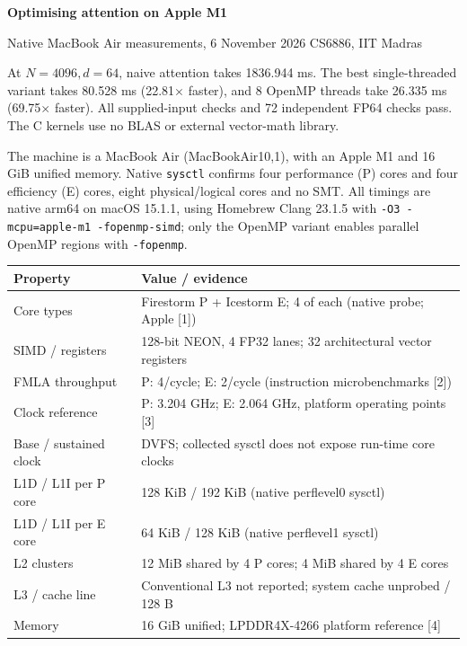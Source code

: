 \documentclass[10pt,a4paper]{article}
\newcommand{\question}[1]{\vspace{1mm}{\large\bfseries #1}\par\vspace{1mm}}
\begin{document}
{\LARGE\bfseries Optimising attention on Apple M1}\par
{\small Native MacBook Air measurements, 6 November 2026 \hfill CS6886, IIT Madras}

At $N=4096,d=64$, naive attention takes 1836.944 ms. The best single-threaded
variant takes 80.528 ms (22.81$\times$ faster), and 8 OpenMP threads take
26.335 ms (69.75$\times$ faster). All supplied-input checks and 72 independent
FP64 checks pass. The C kernels use no BLAS or external vector-math library.

\question{Q1. Machine and peak calculations}
The machine is a MacBook Air (MacBookAir10,1), with an Apple M1 and 16 GiB unified memory.
Native \texttt{sysctl} confirms four performance (P) cores and four efficiency (E) cores,
eight physical/logical cores and no SMT. All timings are native arm64 on macOS 15.1.1,
using Homebrew Clang 23.1.5 with \texttt{-O3 -mcpu=apple-m1 -fopenmp-simd};
only the OpenMP variant enables parallel OpenMP regions with \texttt{-fopenmp}.
\begin{center}
\footnotesize
\begin{tabular}{lp{111mm}}
\toprule
Property & Value / evidence \\
\midrule
Core types & Firestorm P + Icestorm E; 4 of each (native probe; Apple [1]) \\
SIMD / registers & 128-bit NEON, 4 FP32 lanes; 32 architectural vector registers \\
FMLA throughput & P: 4/cycle; E: 2/cycle (instruction microbenchmarks [2]) \\
Clock reference & P: 3.204 GHz; E: 2.064 GHz, platform operating points [3] \\
Base / sustained clock & DVFS; collected sysctl does not expose run-time core clocks \\
L1D / L1I per P core & 128 KiB / 192 KiB (native perflevel0 sysctl) \\
L1D / L1I per E core & 64 KiB / 128 KiB (native perflevel1 sysctl) \\
L2 clusters & 12 MiB shared by 4 P cores; 4 MiB shared by 4 E cores \\
L3 / cache line & Conventional L3 not reported; system cache unprobed / 128 B \\
Memory & 16 GiB unified; LPDDR4X-4266 platform reference [4] \\
\bottomrule
\end{tabular}
\end{center}
\end{document}
